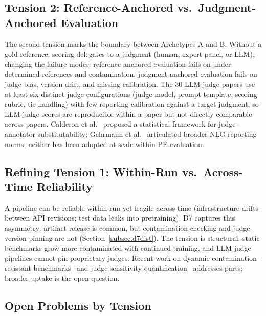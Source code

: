 \documentclass[acmsmall, nonacm, screen]{acmart}
\begin{document}
\subsection{Tension 2: Reference-Anchored vs.\ Judgment-Anchored Evaluation}
\label{subsec:tension_reference}

The second tension marks the boundary between Archetypes A and
B. Without a gold reference, scoring delegates to a judgment (human,
expert panel, or LLM), changing the failure modes: reference-anchored
evaluation fails on under-determined references and contamination;
judgment-anchored evaluation fails on judge bias, version drift, and
missing calibration. The 30 LLM-judge papers use at least six
distinct judge configurations (judge model, prompt template, scoring
rubric, tie-handling) with few reporting calibration against a target
judgment, so LLM-judge scores are reproducible within a paper but not
directly comparable across papers. Calderon et
al.~\cite{alternativeannotator2025} proposed a statistical framework
for judge--annotator substitutability; Gehrmann et
al.~\cite{repairing2022} articulated broader NLG reporting norms;
neither has been adopted at scale within PE evaluation.

\subsection{Refining Tension 1: Within-Run vs.\ Across-Time Reliability}
\label{subsec:tension_acrosstime}

A pipeline can be reliable within-run yet fragile across-time
(infrastructure drifts between API revisions; test data leaks into
pretraining). D7 captures this asymmetry: artifact release is
common, but contamination-checking and judge-version pinning are
not (Section~\ref{subsec:d7dist}). The tension is structural: static
benchmarks grow more contaminated with continued training, and
LLM-judge pipelines cannot pin proprietary judges. Recent work on
dynamic contamination-resistant benchmarks~\cite{wildbench2024} and
judge-sensitivity quantification~\cite{bellibatlu2026judgesense,
feng2025sage} addresses parts; broader uptake is the open question.

\subsection{Open Problems by Tension}
\label{subsec:open_problems}
\end{document}
